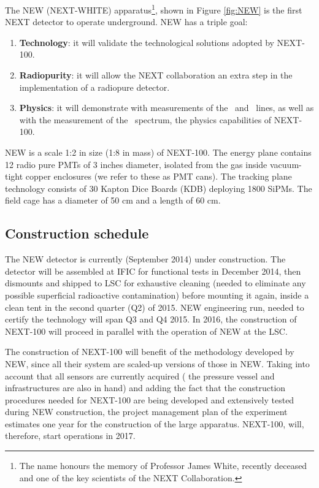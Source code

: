 \documentclass[a4paper,11pt,oneside]{article}
\begin{document}
The NEW (NEXT-WHITE) apparatus\footnote{The name honours the memory of Professor James White, recently deceased and one of the key scientists of the NEXT Collaboration.}, shown in Figure \ref{fig:NEW} is the first NEXT detector to operate underground. NEW has a triple goal:

\begin{enumerate}
\item {\bf Technology}: it will validate the technological solutions adopted by NEXT-100.
\item {\bf Radiopurity}: it will allow the NEXT collaboration an extra step in the implementation of a radiopure detector.
\item {\bf Physics}: it will demonstrate with measurements of the \BI\ and \TL\ lines, as well as with the measurement of the \bbtnu\ spectrum, the physics capabilities of NEXT-100.
\end{enumerate}

NEW is a scale 1:2 in size (1:8 in mass) of NEXT-100. The energy plane contains 12 radio pure PMTs
of 3 inches diameter, isolated from the gas inside vacuum-tight copper enclosures (we refer to these as PMT cans). The tracking plane technology consists of 30 Kapton Dice Boards (KDB) deploying 1800 SiPMs. The field cage has a diameter of 50 cm and a length of 60 cm. 

\subsection*{Construction schedule}
\label{sec.cons}

The NEW detector is currently (September 2014) under construction. The detector will be assembled at IFIC for functional tests in December 2014, then dismounts and shipped to LSC for exhaustive cleaning (needed to eliminate any possible superficial radioactive contamination) before mounting it again, inside a clean tent in the second quarter (Q2) of 2015. NEW engineering run, needed to certify the technology will span Q3 and Q4 2015. In 2016, the construction of NEXT-100 will proceed in parallel with the operation of NEW at the LSC. 

The construction of NEXT-100 will benefit of the methodology developed by NEW, since all their system are scaled-up versions of those in NEW. Taking into account that all sensors are currently acquired ( the pressure vessel and infrastructures are also in hand) and adding the fact that the construction procedures needed for NEXT-100 are being developed and extensively tested during NEW construction, the project management plan of the experiment estimates one year for the construction of the large apparatus. NEXT-100, will, therefore, start operations in 2017.
\end{document}
